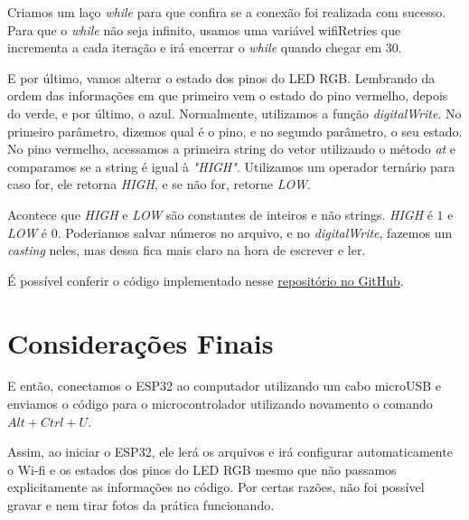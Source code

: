 \documentclass[12pt]{article}
\begin{document}


Criamos um laço \textit{while} para que confira se a conexão foi realizada com sucesso. Para que o \textit{while} não seja infinito, usamos uma variável wifiRetries que incrementa a cada iteração e irá encerrar o \textit{while} quando chegar em 30.



E por último, vamos alterar o estado dos pinos do LED RGB. Lembrando da ordem das informações em que primeiro vem o estado do pino vermelho, depois do verde, e por último, o azul. Normalmente, utilizamos a função \textit{digitalWrite}. No primeiro parâmetro, dizemos qual é o pino, e no segundo parâmetro, o seu estado. No pino vermelho, acessamos a primeira string do vetor utilizando o método \textit{at} e comparamos se a string é igual à \textit{"HIGH"}. Utilizamos um operador ternário para caso for, ele retorna \textit{HIGH}, e se não for, retorne \textit{LOW}.



Acontece que \textit{HIGH} e \textit{LOW} são constantes de inteiros e não strings. \textit{HIGH} é $1$ e \textit{LOW} é $0$. Poderiamos salvar números no arquivo, e no \textit{digitalWrite}, fazemos um \textit{casting} neles, mas dessa fica mais claro na hora de escrever e ler.

É possível conferir o código implementado nesse \href{https://github.com/fabricio-araujo94/microcontroladores/tree/main/little_fs}{repositório no GitHub}.

\section{Considerações Finais}

E então, conectamos o ESP32 ao computador utilizando um cabo microUSB e enviamos o código para o microcontrolador utilizando novamento o comando $Alt + Ctrl + U$.

Assim, ao iniciar o ESP32, ele lerá os arquivos e irá configurar automaticamente o Wi-fi e os estados dos pinos do LED RGB mesmo que não passamos explicitamente as informações no código. Por certas razões, não foi possível gravar e nem tirar fotos da prática funcionando.
\end{document}
